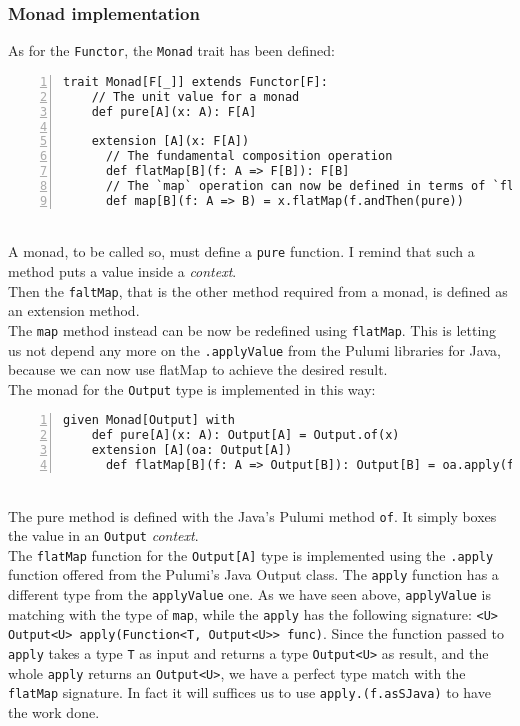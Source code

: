 \subsubsection{Monad implementation}
As for the \texttt{Functor}, the \texttt{Monad} trait has been defined:
\begin{lstlisting}[numbers=left, numberstyle=\tiny, numbersep=-5pt, stepnumber=1, linewidth=420pt]
  trait Monad[F[_]] extends Functor[F]:
    // The unit value for a monad
    def pure[A](x: A): F[A]

    extension [A](x: F[A])
      // The fundamental composition operation
      def flatMap[B](f: A => F[B]): F[B]
      // The `map` operation can now be defined in terms of `flatMap`
      def map[B](f: A => B) = x.flatMap(f.andThen(pure))
\end{lstlisting}\mbox{}\\
A monad, to be called so, must define a \texttt{pure} function.
I remind that such a method puts a value inside a \textit{context}.\\
Then the \texttt{faltMap}, that is the other method required from a monad, is defined as an extension method.\\
The \texttt{map} method instead can be now be redefined using \texttt{flatMap}.
This is letting us not depend any more on the \texttt{.applyValue} from the Pulumi libraries for Java, because we can now use flatMap to achieve the desired result.\\
The monad for the \texttt{Output} type is implemented in this way:
\begin{lstlisting}[numbers=left, numberstyle=\tiny, numbersep=-5pt, stepnumber=1, linewidth=420pt]
  given Monad[Output] with
    def pure[A](x: A): Output[A] = Output.of(x)
    extension [A](oa: Output[A])
      def flatMap[B](f: A => Output[B]): Output[B] = oa.apply(f.asJava)
\end{lstlisting}\mbox{}\\
The pure method is defined with the Java's Pulumi method \texttt{of}.
It simply boxes the value in an \texttt{Output} \textit{context}.\\
The \texttt{flatMap} function for the \texttt{Output[A]} type is implemented using the \texttt{.apply} function offered from the Pulumi's Java Output class.
The \texttt{apply} function has a different type from the \texttt{applyValue} one.
As we have seen above, \texttt{applyValue} is matching with the type of \texttt{map}, while the \texttt{apply} has the following signature: \texttt{<U> Output<U> apply(Function<T, Output<U>> func)}.
Since the function passed to \texttt{apply} takes a type \texttt{T} as input and returns a type \texttt{Output<U>} as result, and the whole \texttt{apply} returns an \texttt{Output<U>}, we have a perfect type match with the \texttt{flatMap} signature.
In fact it will suffices us to use \texttt{apply.(f.asSJava)} to have the work done.

